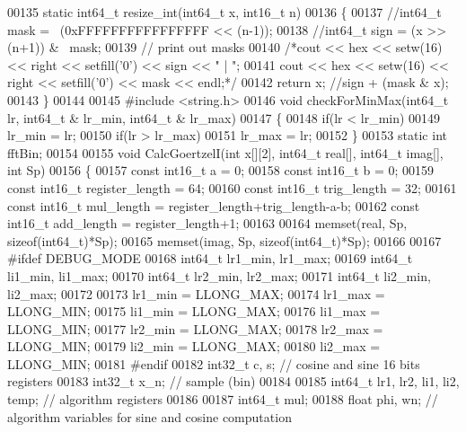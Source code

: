 \begin{DoxyCode}
00135 \textcolor{keyword}{static} int64\_t resize_int(int64\_t x, int16\_t n)
00136 \{
00137     \textcolor{comment}{//int64\_t mask = ~(0xFFFFFFFFFFFFFFFF << (n-1));}
00138     \textcolor{comment}{//int64\_t sign = (x >> (n+1)) & ~mask;}
00139     \textcolor{comment}{// print out masks}
00140     \textcolor{comment}{/*cout << hex << setw(16) << right << setfill('0') << sign << " | ";}
00141 \textcolor{comment}{    cout << hex << setw(16) << right << setfill('0') << mask << endl;*/}
00142     \textcolor{keywordflow}{return} x; \textcolor{comment}{//sign + (mask & x);}
00143 \}
00144 
00145 \textcolor{preprocessor}{#include <string.h>}
00146 \textcolor{keywordtype}{void} checkForMinMax(int64\_t lr, int64\_t & lr\_min, int64\_t & lr\_max)
00147 \{
00148     \textcolor{keywordflow}{if}(lr < lr\_min)
00149         lr\_min = lr;
00150     \textcolor{keywordflow}{if}(lr > lr\_max)
00151         lr\_max = lr;
00152 \}
00153 \textcolor{keyword}{static} \textcolor{keywordtype}{int} fftBin;
00154 
00155 \textcolor{keywordtype}{void} CalcGoertzelI(\textcolor{keywordtype}{int} x[][2], int64\_t real[], int64\_t imag[], \textcolor{keywordtype}{int} Sp)
00156 \{
00157   \textcolor{keyword}{const} int16\_t a = 0;
00158   \textcolor{keyword}{const} int16\_t b = 0;
00159   \textcolor{keyword}{const} int16\_t register\_length = 64;
00160   \textcolor{keyword}{const} int16\_t trig\_length = 32;
00161   \textcolor{keyword}{const} int16\_t mul\_length  = register\_length+trig\_length-a-b;
00162   \textcolor{keyword}{const} int16\_t add\_length  = register\_length+1;
00163 
00164   memset(real, Sp, \textcolor{keyword}{sizeof}(int64\_t)*Sp);
00165   memset(imag, Sp, \textcolor{keyword}{sizeof}(int64\_t)*Sp);
00166 
00167 \textcolor{preprocessor}{  #ifdef DEBUG\_MODE}
00168       int64\_t lr1\_min, lr1\_max;
00169       int64\_t li1\_min, li1\_max;
00170       int64\_t lr2\_min, lr2\_max;
00171       int64\_t li2\_min, li2\_max;
00172 
00173       lr1\_min = LLONG\_MAX;
00174       lr1\_max = LLONG\_MIN;
00175       li1\_min = LLONG\_MAX;
00176       li1\_max = LLONG\_MIN;
00177       lr2\_min = LLONG\_MAX;
00178       lr2\_max = LLONG\_MIN;
00179       li2\_min = LLONG\_MAX;
00180       li2\_max = LLONG\_MIN;
00181 \textcolor{preprocessor}{  #endif}
00182   int32\_t c, s;     \textcolor{comment}{// cosine and sine 16 bits registers}
00183   int32\_t x\_n;      \textcolor{comment}{// sample (bin)}
00184 
00185   int64\_t lr1, lr2, li1, li2, temp; \textcolor{comment}{// algorithm registers}
00186 
00187   int64\_t mul;
00188   \textcolor{keywordtype}{float} phi, wn;    \textcolor{comment}{// algorithm variables for sine and cosine computation}

\end{DoxyCode}
